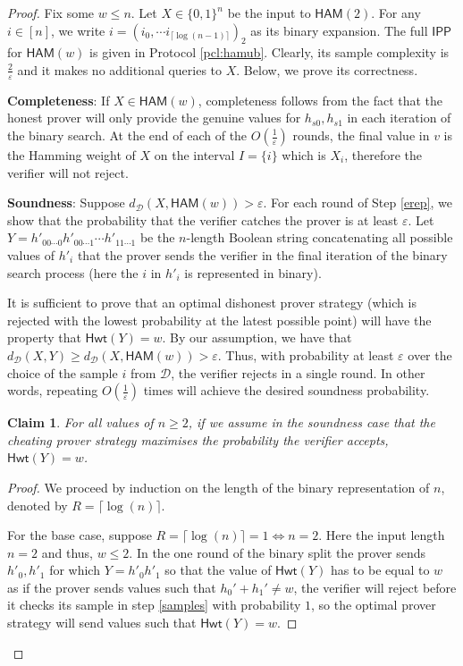 \documentclass[10pt,a4paper]{article}
\newtheorem{claim}[theorem]{Claim}
\newcommand{\Hamming}{\mathsf{Hwt}}
\newcommand{\HAM}{\mathsf{HAM}}
\newcommand{\IPP}{\mathsf{IPP}}
\newcommand{\sD}{\mathcal{D}}
\begin{document}
\begin{proof}
Fix some $w \leq n$. Let $X \in \{0,1\}^n$ be the input to $\HAM(2)$. For any $i \in [n]$, we write $i=(i_{0}, \cdots i_{\lceil \log(n-1)\rceil})_{2}$ as its binary expansion. The full $\IPP$ for $\HAM(w)$ is given in Protocol \ref{pcl:hamub}. Clearly, its sample complexity is $\frac{2}{\varepsilon}$ and it makes no additional queries to $X$. Below, we prove its correctness.

\textbf{Completeness}: If $X\in \HAM(w)$, completeness follows from the fact that the honest prover will only provide the genuine values for $h_{s0}, h_{s1}$ in each iteration of the binary search. At the end of each of the $O\left(\frac{1}{\varepsilon}\right)$ rounds, the final value in $v$ is the Hamming weight of $X$ on the interval $I=\{i\}$ which is $X_{i}$, therefore the verifier will not reject.

\textbf{Soundness}: Suppose $d_{\mathcal{D}}(X,\HAM(w))>\varepsilon$. For each round of Step \ref{erep}, we show that the probability that the verifier catches the prover is at least $\varepsilon$. Let $Y=h'_{00\cdots0}h'_{00\cdots1}\cdots h'_{11\cdots1}$ be the $n$-length Boolean string concatenating all possible values of $h'_{i}$ that the prover sends the verifier in the final iteration of the binary search process (here the $i$ in $h'_{i}$ is represented in binary). 

It is sufficient to prove that an optimal dishonest prover strategy (which is rejected with the lowest probability at the latest possible point) will have the property that $\Hamming(Y)=w$. By our assumption, we have that $d_{\mathcal{D}}(X,Y)\geq d_{\mathcal{D}}(X,\HAM(w))>\varepsilon$. Thus, with probability at least $\varepsilon$ over the choice of the sample $i$ from $\sD$, the verifier rejects in a single round. In other words, repeating $O\left(\frac{1}{\varepsilon}\right)$ times will achieve the desired soundness probability.

\begin{claim}
For all values of $n\geq 2$, if we assume in the soundness case that the cheating prover strategy maximises the probability the verifier accepts, $\Hamming(Y)=w$.
\end{claim}
\begin{proof}
We proceed by induction on the length of the binary representation of $n$, denoted by $R =\lceil \log(n)\rceil$.

For the base case, suppose $R=\lceil \log(n)\rceil=1 \iff n=2$. Here the input length $n =2$ and thus, $ w \leq 2$. In the one round of the binary split the prover sends $h'_{0}, h'_{1}$ for which $Y=h'_{0}h'_{1}$ so that the value of $\Hamming(Y)$ has to be equal to $w$ as if the prover sends values such that $h_{0}'+h_{1}'\neq w$, the verifier will reject before it checks its sample in step \ref{samples} with probability $1$, so the optimal prover strategy will send values such that $\Hamming(Y)=w$.


\end{proof}
\end{proof}
\end{document}
